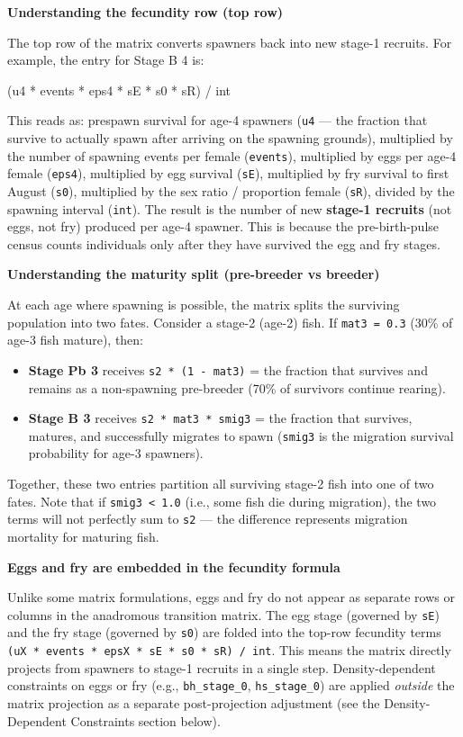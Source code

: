 \documentclass[
  letterpaper,
  DIV=11,
  numbers=noendperiod]{scrreprt}
\providecommand{\tightlist}{%
  \setlength{\itemsep}{0pt}\setlength{\parskip}{0pt}}
\begin{document}
\textbf{Understanding the fecundity row (top row)}

The top row of the matrix converts spawners back into new stage-1
recruits. For example, the entry for Stage B 4 is:

(u4 * events * eps4 * sE * s0 * sR) / int

This reads as: prespawn survival for age-4 spawners (\texttt{u4} --- the
fraction that survive to actually spawn after arriving on the spawning
grounds), multiplied by the number of spawning events per female
(\texttt{events}), multiplied by eggs per age-4 female (\texttt{eps4}),
multiplied by egg survival (\texttt{sE}), multiplied by fry survival to
first August (\texttt{s0}), multiplied by the sex ratio / proportion
female (\texttt{sR}), divided by the spawning interval (\texttt{int}).
The result is the number of new \textbf{stage-1 recruits} (not eggs, not
fry) produced per age-4 spawner. This is because the pre-birth-pulse
census counts individuals only after they have survived the egg and fry
stages.

\textbf{Understanding the maturity split (pre-breeder vs breeder)}

At each age where spawning is possible, the matrix splits the surviving
population into two fates. Consider a stage-2 (age-2) fish. If
\texttt{mat3\ =\ 0.3} (30\% of age-3 fish mature), then:

\begin{itemize}
\tightlist
\item
  \textbf{Stage Pb 3} receives \texttt{s2\ *\ (1\ -\ mat3)} = the
  fraction that survives and remains as a non-spawning pre-breeder (70\%
  of survivors continue rearing).
\item
  \textbf{Stage B 3} receives \texttt{s2\ *\ mat3\ *\ smig3} = the
  fraction that survives, matures, and successfully migrates to spawn
  (\texttt{smig3} is the migration survival probability for age-3
  spawners).
\end{itemize}

Together, these two entries partition all surviving stage-2 fish into
one of two fates. Note that if \texttt{smig3\ \textless{}\ 1.0} (i.e.,
some fish die during migration), the two terms will not perfectly sum to
\texttt{s2} --- the difference represents migration mortality for
maturing fish.

\textbf{Eggs and fry are embedded in the fecundity formula}

Unlike some matrix formulations, eggs and fry do not appear as separate
rows or columns in the anadromous transition matrix. The egg stage
(governed by \texttt{sE}) and the fry stage (governed by \texttt{s0})
are folded into the top-row fecundity terms
\texttt{(uX\ *\ events\ *\ epsX\ *\ sE\ *\ s0\ *\ sR)\ /\ int}. This
means the matrix directly projects from spawners to stage-1 recruits in
a single step. Density-dependent constraints on eggs or fry (e.g.,
\texttt{bh\_stage\_0}, \texttt{hs\_stage\_0}) are applied \emph{outside}
the matrix projection as a separate post-projection adjustment (see the
Density-Dependent Constraints section below).
\end{document}
